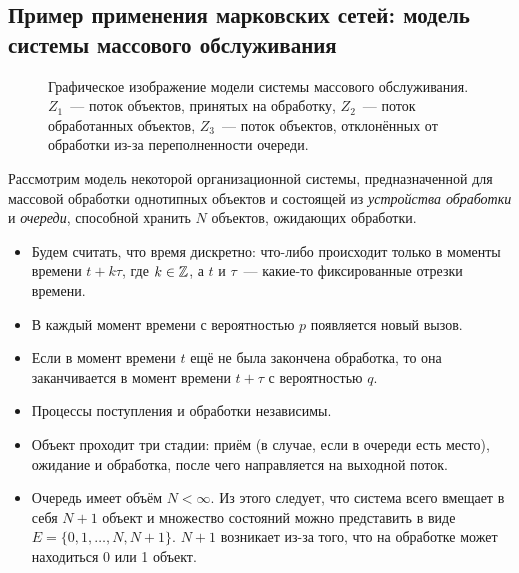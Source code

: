 \subsection{Пример применения марковских сетей: модель системы массового 
обслуживания}

\begin{figure}[H]
	\begin{center}
	\end{center}
	\caption{Графическое изображение модели системы массового обслуживания. 
	\(Z_{1}\)~--- поток объектов, принятых на обработку, \(Z_{2}\)~--- поток 
	обработанных объектов, \(Z_{3}\)~--- поток объектов, отклонённых от 
	обработки из-за переполненности очереди.}
\end{figure}
Рассмотрим модель некоторой организационной системы, предназначенной для 
массовой обработки однотипных объектов и состоящей из \emph{устройства 
обработки} и \emph{очереди}, способной хранить \(N\) объектов, ожидающих 
обработки. 
\begin{itemize}
	\item Будем считать, что время дискретно: что-либо происходит только в 
	моменты времени \(t + k\tau\), где \(k \in \mathbb{Z}\), а \(t\) и \(\tau\)~--- 
	какие-то фиксированные отрезки времени.
	\item В каждый момент времени с вероятностью \(p\) появляется новый вызов.
	\item Если в момент времени \(t\) ещё не была закончена обработка, то она 
	заканчивается в момент времени \(t + \tau\) с вероятностью \(q\).
	\item Процессы поступления и обработки независимы.
	\item Объект проходит три стадии: приём (в случае, если в очереди есть 
	место), ожидание и обработка, после чего направляется на выходной поток.
	\item Очередь имеет объём \(N < \infty\). Из этого следует, что система 
	всего вмещает в себя \(N + 1\) объект и множество состояний можно 
	представить в виде \(E = \{0, 1, \ldots, N, N + 1\}\). \(N + 1\) возникает 
	из-за того, что на обработке может находиться 0 или 1 объект.
\end{itemize}

